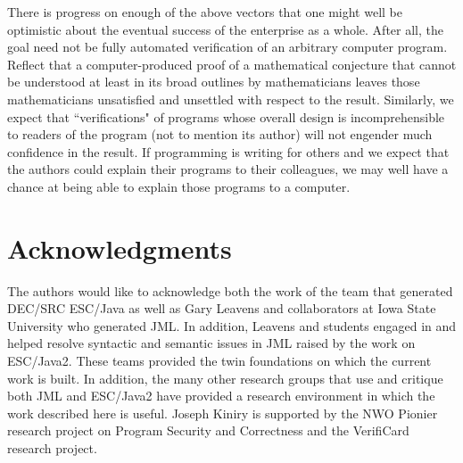 \documentclass{sig-alternate}
\begin{document}
There is progress on enough of the above vectors that one might well
be optimistic about the eventual success of the enterprise as a whole.
After all, the goal need not be fully automated verification of an
arbitrary computer program.  Reflect that a computer-produced proof of
a mathematical conjecture that cannot be understood at least in its
broad outlines by mathematicians leaves those mathematicians
unsatisfied and unsettled with respect to the result.  Similarly, we
expect that ``verifications" of programs whose overall design is
incomprehensible to readers of the program (not to mention its author)
will not engender much confidence in the result.  If programming is
writing for others and we expect that the authors could explain their
programs to their colleagues, we may well have a chance at being able
to explain those programs to a computer.


\section{Acknowledgments}
The authors would like to acknowledge both the work of the team that
generated DEC/SRC ESC/Java as well as Gary Leavens and collaborators
at Iowa State University who generated JML.  In addition, Leavens and
students engaged in and helped resolve syntactic and semantic issues
in JML raised by the work on ESC/Java2.  These teams provided the twin
foundations on which the current work is built.  In addition, the many
other research groups that use and critique both JML and ESC/Java2
have provided a research environment in which the work described here
is useful.  Joseph Kiniry is supported by the NWO Pionier research
project on Program Security and Correctness and the VerifiCard
research project.


%

  
\end{document}
